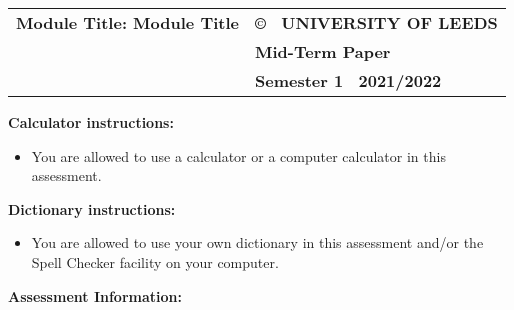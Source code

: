 \documentclass[12pt]{article}
\def\semester{Semester 1}
\def\session{2021/2022}
\def\module{Module Title} %
\begin{document}
	
	\normalsize
	\vspace{3mm}
	
	{\renewcommand{\arraystretch}{1.5}
		\begin{tabular}[h]{p{9cm}p{7cm}}
			{\bf Module Title: \module}\vspace{1.5cm} %
			& {\bf \copyright ~ UNIVERSITY OF LEEDS} \\
			& \textbf{Mid-Term Paper}\\
			\noindent{\bf School of Physics and Astronomy} & {\bf \semester ~ \session}\\ 
		\end{tabular}
	}
	
	\vspace*{1cm}
	
	
\textbf{Calculator instructions:}
\begin{itemize}[itemsep=3pt,topsep=0pt]
\item You are allowed to use a calculator or a computer calculator in this assessment. 
\end{itemize}
\textbf{Dictionary instructions:}
\begin{itemize}[itemsep=3pt,topsep=0pt]
	\item You are allowed to use your own dictionary in this assessment and/or the Spell Checker facility on your computer. 
\end{itemize}
\textbf{Assessment Information:}
\end{document}
